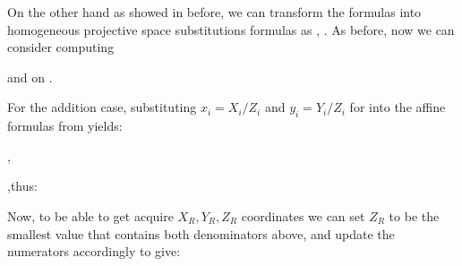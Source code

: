 On the other hand as showed in 
before, we can transform the formulas into homogeneous projective space substitutions formulas as , . As before, now we can consider computing 

 and  on \EquationShortWeierstrassEquationHomoennised. 

For the addition case, substituting $x_i = X_i/Z_i$ and $y_i=Y_i/Z_i$ for  into the affine formulas from  yields:

,

,thus:


Now, to be able to get acquire $X_R, Y_R, Z_R$ coordinates we can set $Z_R$ 
to be the smallest value that contains both denominators above, and update the numerators accordingly to give:

